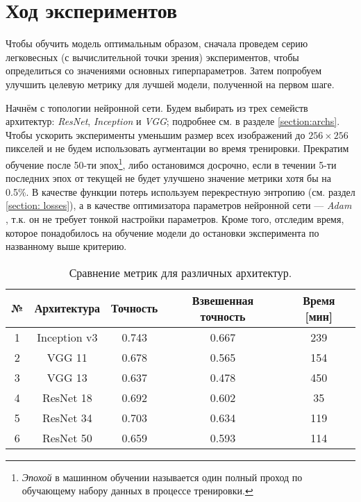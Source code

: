 \section{Ход экспериментов}

\indent
\indent
Чтобы обучить модель оптимальным образом, сначала проведем серию
легковесных (с вычислительной точки зрения) экспериментов, чтобы определиться 
со значениями основных гиперпараметров. Затем попробуем улучшить целевую метрику
для лучшей модели, полученной на первом шаге.

\indent
\indent
Начнём с топологии нейронной сети. Будем выбирать из трех семейств архитектур:
 \textit{ResNet}, \textit{Inception} и \textit{VGG}; подробнее см. в разделе \ref{section:archs}.
Чтобы ускорить эксперименты уменьшим размер всех изображений до
$256 \times 256$ пикселей и не будем использовать аугментации во время тренировки.
Прекратим обучение после 50-ти
эпох\footnote{\textit{Эпохой} в машинном обучении называется один полный проход по
обучающему набору данных в процессе тренировки.}, либо остановимся досрочно,
если в течении 5-ти последних эпох от текущей не будет улучшено 
значение метрики хотя бы на 0.5\%. В качестве функции потерь используем
 перекрестную энтропию (см. раздел \ref{section: losses}),
 а в качестве оптимизатора параметров 
нейронной сети --- \textit{Adam} \cite{adam}, т.к. он не требует тонкой настройки
параметров. Кроме того, отследим время, которое 
понадобилось на обучение модели до остановки эксперимента 
по названному выше критерию.


\begin{table}[h!]
    \begin{center}
        \begin{tabular}{c | c| c | c | c}
            \hline
            № & Архитектура & Точность & Взвешенная точность  & Время [мин] \\
            \hline
    
            1 & Inception v3 & 0.743 & 0.667 & 239 \\
            
            2 & VGG 11 & 0.678 & 0.565 & 154 \\
            
            3 & VGG 13 & 0.637 & 0.478 & 450 \\
            
            4 & ResNet 18 & 0.692 & 0.602 & 35 \\
            
            5 & ResNet 34 & 0.703 & 0.634 & 119 \\
            
            6 & ResNet 50 & 0.659 & 0.593 & 114 \\
    
            \hline
        \end{tabular}
    \end{center}
    \caption{Сравнение метрик для различных архитектур.}
    \label{tabular: arch_compare}
\end{table}


